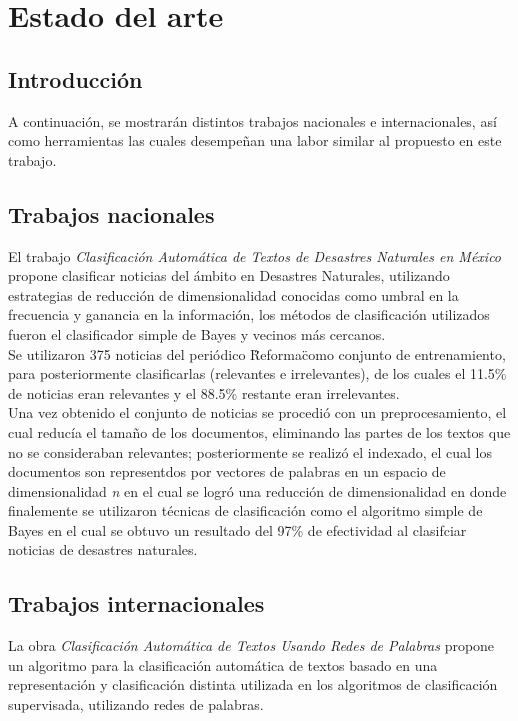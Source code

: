 
\chapter{Estado del arte}

\section{Introducción}

	A continuación, se mostrarán distintos trabajos nacionales e internacionales, así como herramientas las cuales desempeñan una labor similar al propuesto en este trabajo.\\

\section{Trabajos nacionales}%

	El trabajo \textit{Clasificación Automática de Textos de Desastres Naturales en México}
	propone clasificar noticias del ámbito en Desastres Naturales, utilizando estrategias de reducción de dimensionalidad conocidas como umbral en la frecuencia y ganancia en la información, los métodos de clasificación utilizados fueron el clasificador simple de Bayes y vecinos más cercanos.\\

	Se utilizaron 375 noticias del periódico \"Reforma\" como conjunto de entrenamiento, para posteriormente clasificarlas (relevantes e irrelevantes), de los cuales el 11.5\% de noticias eran relevantes y el 88.5\% restante eran irrelevantes.\\

	Una vez obtenido el conjunto de noticias se procedió con un pre\-procesamiento, el cual reducía el tamaño de los documentos, eliminando las partes de los textos que no se consideraban relevantes; posteriormente se realizó el indexado, el cual los documentos son representdos por vectores de palabras en un espacio de dimensionalidad \textit{n} en el cual se logró una reducción de dimensionalidad en donde finalemente se utilizaron técnicas de clasificación como el algoritmo simple de Bayes en el cual se obtuvo un resultado del 97\% de efectividad al clasifciar noticias de desastres naturales.\\



\section{Trabajos internacionales}
	La obra \textit{Clasificación Automática de Textos Usando Redes de Palabras} propone un algoritmo para la clasificación automática de textos basado en una representación y clasificación distinta utilizada en los algoritmos de clasificación supervisada, utilizando redes de palabras.\\

